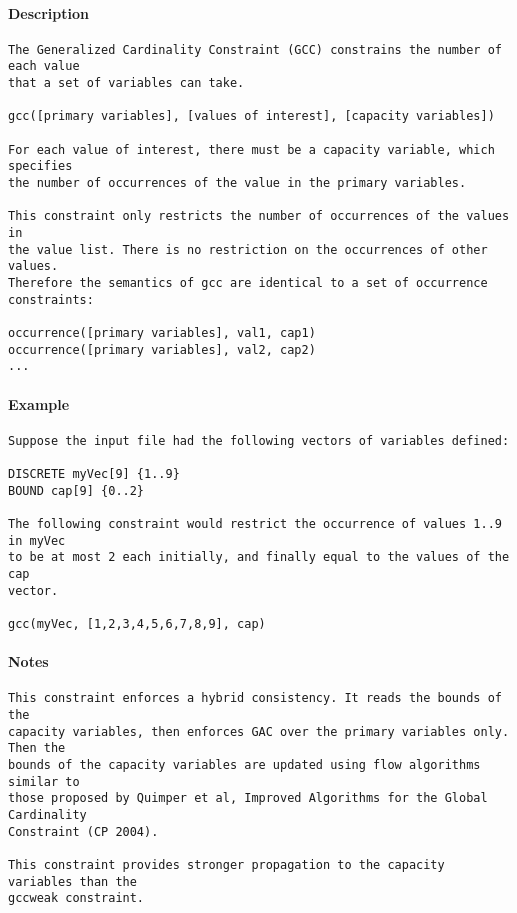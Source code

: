 \paragraph{Description}
{\footnotesize
\begin{verbatim}
The Generalized Cardinality Constraint (GCC) constrains the number of each value
that a set of variables can take.

gcc([primary variables], [values of interest], [capacity variables])

For each value of interest, there must be a capacity variable, which specifies
the number of occurrences of the value in the primary variables.

This constraint only restricts the number of occurrences of the values in
the value list. There is no restriction on the occurrences of other values.
Therefore the semantics of gcc are identical to a set of occurrence 
constraints:

occurrence([primary variables], val1, cap1)
occurrence([primary variables], val2, cap2)
...
\end{verbatim}
}
\paragraph{Example}
{\footnotesize
\begin{verbatim}
Suppose the input file had the following vectors of variables defined:

DISCRETE myVec[9] {1..9}
BOUND cap[9] {0..2}

The following constraint would restrict the occurrence of values 1..9 in myVec
to be at most 2 each initially, and finally equal to the values of the cap
vector.

gcc(myVec, [1,2,3,4,5,6,7,8,9], cap)
\end{verbatim}
}
\paragraph{Notes}
{\footnotesize
\begin{verbatim}
This constraint enforces a hybrid consistency. It reads the bounds of the
capacity variables, then enforces GAC over the primary variables only.  Then the
bounds of the capacity variables are updated using flow algorithms similar to
those proposed by Quimper et al, Improved Algorithms for the Global Cardinality
Constraint (CP 2004).

This constraint provides stronger propagation to the capacity variables than the
gccweak constraint.
\end{verbatim}
}
